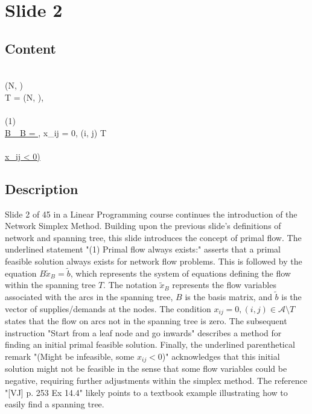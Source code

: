 \documentclass{article}%
\begin{document}
%
\newpage%
\section{Slide 2}%
\label{sec:Slide2}%
\subsection{Content}%

\underline{} \\
\underline{} (N, ) \\
\underline{} T = (N, ),  \\
 \\
(1) \underline{} \\
\underline{B _B = }, \quad x_{ij} = 0, \quad (i, j) \in {} \setminus T \\
 \\
\underline{ x_{ij} < 0)}
%
\subsection{Description}%
Slide 2 of 45 in a Linear Programming course continues the introduction of the Network Simplex Method.  Building upon the previous slide's definitions of network and spanning tree, this slide introduces the concept of primal flow.  The underlined statement "(1) Primal flow always exists:" asserts that a primal feasible solution always exists for network flow problems. This is followed by the equation $B\tilde{x}_B = \tilde{b}$, which represents the system of equations defining the flow within the spanning tree $T$.  The notation $\tilde{x}_B$ represents the flow variables associated with the arcs in the spanning tree, $B$ is the basis matrix, and $\tilde{b}$ is the vector of supplies/demands at the nodes. The condition $x_{ij} = 0, (i, j) \in \mathcal{A} \setminus T$ states that the flow on arcs not in the spanning tree is zero.  The subsequent instruction "Start from a leaf node and go inwards" describes a method for finding an initial primal feasible solution.  Finally, the underlined parenthetical remark "(Might be infeasible, some $x_{ij} < 0$)" acknowledges that this initial solution might not be feasible in the sense that some flow variables could be negative, requiring further adjustments within the simplex method. The reference "[VJ] p. 253 Ex 14.4" likely points to a textbook example illustrating how to easily find a spanning tree.%
\end{document}
